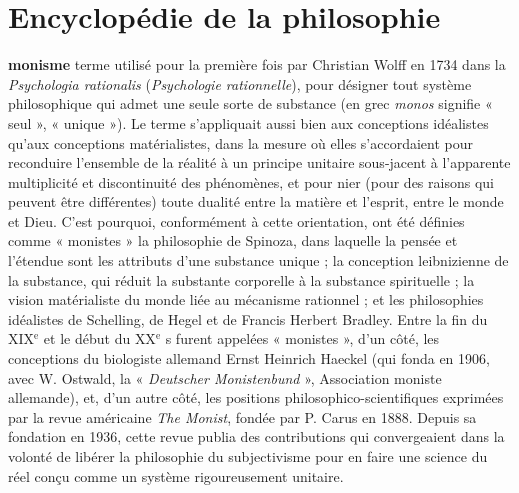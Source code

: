 
\section{Encyclopédie de la philosophie}
{\bf monisme} terme utilisé pour la première
fois par Christian Wolff en 1734 dans la
{\it Psychologia  rationalis} ({\it Psychologie
rationnelle}), pour désigner tout système
philosophique qui admet une seule sorte
de substance (en grec {\it monos} signifie
%
« seul », « unique »). Le terme s’appliquait aussi bien aux conceptions idéalistes
qu'aux conceptions matérialistes, dans la
mesure où elles s’accordaient pour reconduire l’ensemble de la réalité à un principe unitaire sous-jacent à l’apparente
multiplicité et discontinuité des phénomènes, et pour nier (pour des raisons qui
peuvent être différentes) toute dualité
entre la matière et l’esprit, entre le monde
et Dieu. C’est pourquoi, conformément à
cette orientation, ont été définies comme
« monistes » la philosophie de Spinoza,
dans laquelle la pensée et l'étendue sont
les attributs d’une substance unique ; la
conception leibnizienne de la substance,
qui réduit la substante corporelle à la substance spirituelle ; la vision matérialiste
du monde liée au mécanisme rationnel ;
et les philosophies idéalistes de Schelling,
de Hegel et de Francis Herbert Bradley.
Entre la fin du {\footnotesize XIX}$^\text{e}$ et le début du {\footnotesize XX}$^\text{e}$ s
furent appelées « monistes », d’un côté,
les conceptions du biologiste allemand
Ernst Heinrich Haeckel (qui fonda en
1906, avec W. Ostwald, la « {\it Deutscher
Monistenbund} », Association moniste
allemande), et, d’un autre côté, les positions philosophico-scientifiques  exprimées par la revue américaine {\it The Monist},
fondée par P. Carus en 1888. Depuis sa
fondation en 1936, cette revue publia des
contributions qui convergeaient dans la
volonté de libérer la philosophie du subjectivisme pour en faire une science du
réel conçu comme un système rigoureusement unitaire.

